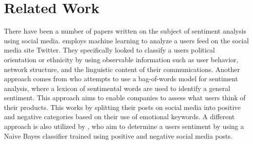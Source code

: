 \section{Related Work} There have been a number of papers written on
the subject of sentiment analysis using social media.
 employs machine learning to analyze a
users feed on the social media site Twitter. They specifically looked to classify a
users political orientation or ethnicity by using observable information such as
user behavior, network structure, and the linguistic content of their
communications. Another approach comes from  who
attempts to use a bag-of-words model for sentiment analysis, where a lexicon of
sentimental words are used to identify a general sentiment.
This approach aims to enable companies to assess what users think of their
products. This works by splitting their posts on social media into positive and
negative categories based on their use of emotional keywords. A different
approach is also utilized by , who aim to determine a
users sentiment by using a Naive Bayes classifier trained using positive and negative
social media posts.